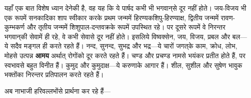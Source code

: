 \begin{sloppypar}\justifying{}
यहाँ एक बात विशेष ध्यान देनेकी है, वह यह कि ये पार्षद कभी भी भगवान्‌से दूर नहीं होते। जय-विजय भी एक रूपमें सनकादिका शाप स्वीकार करके प्रथम जन्ममें हिरण्यकशिपु-हिरण्याक्ष, द्वितीय जन्ममें रावण-कुम्भकर्ण और तृतीय जन्ममें शिशुपाल-दन्तवक्रके रूपमें उपस्थित रहे। पर दूसरे रूपमें वे निरन्तर भगवान्‌की सेवामें ही रहे, वे कभी सेवासे दूर नहीं होते। इसलिये विष्वक्सेन, जय, विजय, प्रबल और बल—ये सदैव मङ्गल ही करते रहते हैं। नन्द, सुनन्द, सुभद्र और भद्र—ये चारों जगत्‌के काम, क्रोध, लोभ, मोहसे उत्पन्न \textbf{आमय} अर्थात् रोगोंको दूर करते रहते हैं। चण्ड और प्रचण्ड नामसे भयंकर प्रतीत होते हैं, पर स्वभावसे बहुत विनीत हैं। कुमुद और कुमुदाक्ष—ये करुणाके आगार हैं। शील, सुशील और सुषेण भावुक भक्तोंका निरन्तर प्रतिपालन करते रहते हैं।
\end{sloppypar}
\begin{sloppypar}\justifying{}
अब नाभाजी हरिवल्लभोंसे प्रार्थना कर रहे हैं—
\end{sloppypar}


